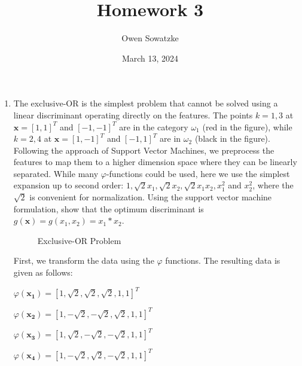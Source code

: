 \documentclass[fleqn]{article}
\title{Homework 3}
\author{Owen Sowatzke}
\date{March 13, 2024}
\newcommand{\zerodisplayskip}{
	\setlength{\abovedisplayskip}{0pt}%
	\setlength{\belowdisplayskip}{0pt}%
	\setlength{\abovedisplayshortskip}{0pt}%
	\setlength{\belowdisplayshortskip}{0pt}%
	\setlength{\mathindent}{0pt}}
\begin{document}
	\offinterlineskip
	\setlength{\lineskip}{12pt}
	\zerodisplayskip
	\maketitle
	
	\begin{enumerate}
		\item The exclusive-OR is the simplest problem that cannot be solved using a linear discriminant operating directly on the features. The points $k=1,3$ at $\mathbf{x} = [1,1]^T$ and $[-1,-1]^T$ are in the category $\omega_1$ (red in the figure), while $k=2,4$ at $\mathbf{x}=[1,-1]^T$ and $[-1,1]^T$ are in $\omega_2$ (black in the figure). Following the approach of Support Vector Machines, we preprocess the features to map them to a higher dimension space where they can be linearly separated. While many $\varphi$-functions could be used, here we use the simplest expansion up to second order: $1, \sqrt{2}x_1, \sqrt{2}x_2, \sqrt{2}x_1x_2, x_1^2$ and $x_2^2$, where the $\sqrt{2}$ is convenient for normalization. Using the support vector machine formulation, show that the optimum discriminant is $g(\mathbf{x}) = g(x_1,x_2) = x_1 * x_2$.
		
	\begin{figure}[H]
		\centerline{}
		\caption{Exclusive-OR Problem}
		\label{exclusive_or}
	\end{figure}
		
	First, we transform the data using the $\varphi$ functions. The resulting data is given as follows:
	
	$\varphi(\mathbf{x_1}) = [1,\sqrt{2},\sqrt{2},\sqrt{2},1,1]^T$
	
	$\varphi(\mathbf{x_2}) = [1,-\sqrt{2},-\sqrt{2},\sqrt{2},1,1]^T$
	
	$\varphi(\mathbf{x_3}) = [1,\sqrt{2},-\sqrt{2},-\sqrt{2},1,1]^T$
	
	$\varphi(\mathbf{x_4}) = [1,-\sqrt{2},\sqrt{2},-\sqrt{2},1,1]^T$
	

\end{enumerate}
\end{document}
